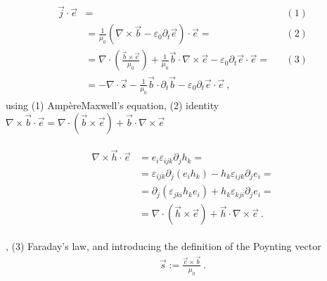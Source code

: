 \documentclass[letterpaper,10pt,english]{jupyterBook}
\begin{document}
\begin{equation}\label{equation:ch/energy-momentum-balance:eq:energy:1}
\begin{split}\begin{aligned}
  \vec{j} \cdot \vec{e} & = && (1) \\
  & = \frac{1}{\mu_0} \left( \nabla \times \vec{b} - \varepsilon_0 \partial_t \vec{e} \right) \cdot \vec{e} = && (2) \\
  & = \nabla \cdot \left( \frac{ \vec{b} \times \vec{e} }{\mu_0} \right) + \frac{1}{\mu_0} \vec{b} \cdot \nabla \times \vec{e} - \varepsilon_0 \partial_t \vec{e} \cdot \vec{e} = && (3) \\
  & = - \nabla \cdot \vec{s} - \frac{1}{\mu_0} \vec{b} \cdot \partial_t \vec{b} - \varepsilon_0 \partial_t \vec{e} \cdot \vec{e} \ ,
\end{aligned}\end{split}
\end{equation}
\sphinxAtStartPar
using (1) Ampère\sphinxhyphen{}Maxwell’s equation, (2) identity \(\nabla \times \vec{b} \cdot \vec{e} =  \nabla \cdot \left( \vec{b} \times \vec{e} \right) + \vec{b} \cdot \nabla \times \vec{e}\)%
\begin{footnote}[1]\sphinxAtStartFootnote
\begin{equation*}
\begin{split}\begin{aligned}
  \nabla \times \vec{h} \cdot \vec{e}
  & = e_i \varepsilon_{ijk} \partial_{j} h_k = \\
  & = \varepsilon_{ijk} \partial_{j} \left( e_i  h_k \right) - h_k \varepsilon_{ijk} \partial_{j} e_i = \\
  & = \partial_{j} \left( \varepsilon_{jki} h_k  e_i \right) + h_k \varepsilon_{kji} \partial_{j} e_i = \\
  & = \nabla \cdot \left( \vec{h} \times \vec{e} \right) + \vec{h} \cdot \nabla \times \vec{e}  \ .
\end{aligned}\end{split}
\end{equation*}%
\end{footnote}, (3) Faraday’s law, and introducing the definition of the Poynting vector
\begin{equation}\label{equation:ch/energy-momentum-balance:eq:energy:poynting-vector}
\begin{split}\vec{s} := \frac{ \vec{e} \times \vec{b} }{\mu_0} \ .\end{split}
\end{equation}
\sphinxAtStartPar
\end{document}
